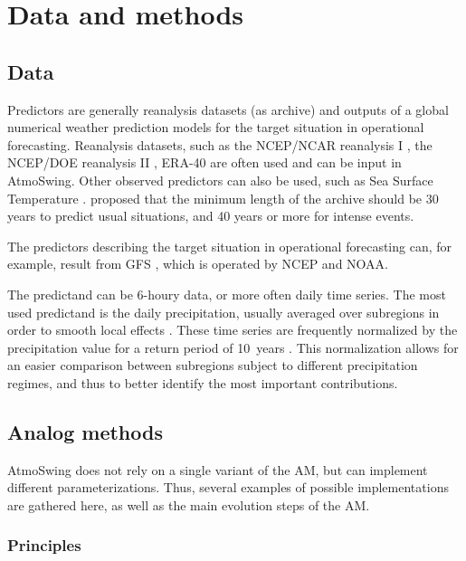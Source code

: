 \documentclass[review]{elsarticle}
\begin{document}
\section{Data and methods}
\label{sec:data_methods}

\subsection{Data}
\label{sec:data}

Predictors are generally reanalysis datasets (as archive) and outputs of a global numerical weather prediction models for the target situation in operational forecasting. Reanalysis datasets, such as the NCEP/NCAR reanalysis I \citep[6-hourly, 17 pressure levels at a resolution of 2.5\degree, see][]{Kalnay1996}, the NCEP/DOE reanalysis II \citep{Kanamitsu2002}, ERA-40 \citep{Uppala2005} are often used and can be input in AtmoSwing. Other observed predictors can also be used, such as Sea Surface Temperature \citep[SST, ][]{Reynolds2007}. \citet{Bontron2004} proposed that the minimum length of the archive should be 30 years to predict usual situations, and 40 years or more for intense events.

The predictors describing the target situation in operational forecasting can, for example, result from GFS \citep[Global Forecast System,][]{Kanamitsu1991,Kanamitsu1989}, which is operated by NCEP and NOAA.

The predictand can be 6-houry data, or more often daily time series. The most used predictand is the daily precipitation, usually averaged over subregions in order to smooth local effects \citep{Obled2002, Marty2012}. These time series are frequently normalized by the precipitation value for a return period of 10~years \citep{Djerboua2001}. This normalization allows for an easier comparison between subregions subject to different precipitation regimes, and thus to better identify the most important contributions.


\subsection{Analog methods}
\label{sec:method}

AtmoSwing does not rely on a single variant of the AM, but can implement different parameterizations. Thus, several examples of possible implementations are gathered here, as well as the main evolution steps of the AM.

\subsubsection{Principles}
\end{document}
